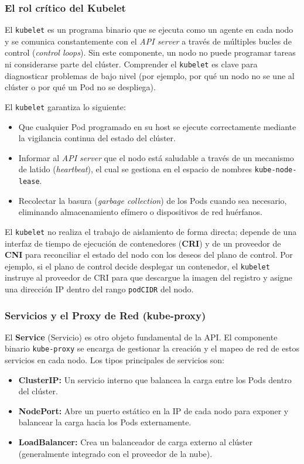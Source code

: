 \subsubsection{El rol crítico del Kubelet}
El \texttt{kubelet} es un programa binario que se ejecuta como un agente en cada nodo y se comunica constantemente con el \textit{API server} a través de múltiples bucles de control (\textit{control loops}). Sin este componente, un nodo no puede programar tareas ni considerarse parte del clúster. Comprender el \texttt{kubelet} es clave para diagnosticar problemas de bajo nivel (por ejemplo, por qué un nodo no se une al clúster o por qué un Pod no se despliega). 

El \texttt{kubelet} garantiza lo siguiente:
\begin{itemize}
    \item Que cualquier Pod programado en su host se ejecute correctamente mediante la vigilancia continua del estado del clúster.
    \item Informar al \textit{API server} que el nodo está saludable a través de un mecanismo de latido (\textit{heartbeat}), el cual se gestiona en el espacio de nombres \texttt{kube-node-lease}.
    \item Recolectar la basura (\textit{garbage collection}) de los Pods cuando sea necesario, eliminando almacenamiento efímero o dispositivos de red huérfanos.
\end{itemize}

El \texttt{kubelet} no realiza el trabajo de aislamiento de forma directa; depende de una interfaz de tiempo de ejecución de contenedores (\textbf{CRI}) y de un proveedor de \textbf{CNI} para reconciliar el estado del nodo con los deseos del plano de control. Por ejemplo, si el plano de control decide desplegar un contenedor, el \texttt{kubelet} instruye al proveedor de CRI para que descargue la imagen del registro y asigne una dirección IP dentro del rango \texttt{podCIDR} del nodo.

\subsubsection{Servicios y el Proxy de Red (kube-proxy)}
El \textbf{Service} (Servicio) es otro objeto fundamental de la API. El componente binario \texttt{kube-proxy} se encarga de gestionar la creación y el mapeo de red de estos servicios en cada nodo. Los tipos principales de servicios son:

\begin{itemize}
    \item \textbf{ClusterIP:} Un servicio interno que balancea la carga entre los Pods dentro del clúster.
    \item \textbf{NodePort:} Abre un puerto estático en la IP de cada nodo para exponer y balancear la carga hacia los Pods externamente.
    \item \textbf{LoadBalancer:} Crea un balanceador de carga externo al clúster (generalmente integrado con el proveedor de la nube).
\end{itemize}

